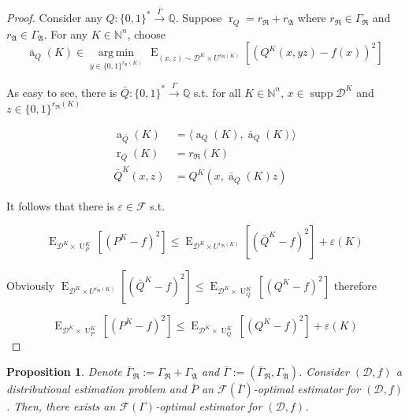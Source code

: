 \documentclass{article}
\numberwithin{equation}{section}
\theoremstyle{definition}
\theoremstyle{plain}
\newtheorem{proposition}{Proposition}[section]
\newcommand{\Bool}{\{0,1\}}
\newcommand{\Words}{{\Bool^*}}
\newcommand{\WordsLen}[1]{{\Bool^{#1}}}
\DeclareMathOperator{\Supp}{supp}
\DeclareMathOperator{\E}{E}
\DeclareMathOperator{\R}{r}
\DeclareMathOperator{\A}{a}
\DeclareMathOperator{\Un}{U}
\newcommand{\Argmin}[1]{\underset{#1}{\operatorname{arg\,min}}\,}
\newcommand{\Nats}{\mathbb{N}}
\newcommand{\Rats}{\mathbb{Q}}
\newcommand{\Chev}[1]{\langle #1 \rangle}
\newcommand{\Dist}{\mathcal{D}}
\newcommand{\GrowR}{\Gamma_{\mathfrak{R}}}
\newcommand{\GrowA}{\Gamma_{\mathfrak{A}}}
\newcommand{\Fall}{\mathcal{F}}
\newcommand{\EG}{\Fall(\Gamma)}
\newcommand{\Scheme}{\xrightarrow{\Gamma}}
\begin{document}
\begin{proof}

Consider any $Q: \Words \xrightarrow{\bar{\Gamma}} \Rats$. Suppose $\R_Q=r_{\mathfrak{R}}+r_{\mathfrak{A}}$ where $r_{\mathfrak{R}} \in \GrowR$ and $r_{\mathfrak{A}} \in \GrowA$. For any $K \in \Nats^n$, choose 
\[\bar{\A}_Q(K) \in \Argmin{y \in \WordsLen{r_{\mathfrak{A}}(K)}} \E_{(x,z) \sim \Dist^{K} \times U^{r_{\mathfrak{R}}(K)}}[(Q^{K}(x,yz) - f(x))^2]\]

As easy to see, there is $\bar{Q}: \Words \Scheme \Rats$ s.t. for all $K \in \Nats^n$, $x \in \Supp \Dist^{K}$ and $z \in \WordsLen{r_{\mathfrak{R}}(K)}$

\begin{align*}
\A_{\bar{Q}}(K)&=\Chev{\A_Q(K),\bar{\A}_Q(K)} \\
\R_{\bar{Q}}(K) &= r_{\mathfrak{R}}(K) \\
\bar{Q}^{K}(x,z)&=Q^{K}(x,\bar{\A}_Q(K)z)
\end{align*}

It follows that there is $\varepsilon \in \Fall$ s.t.

$$\E_{\Dist^{K} \times \Un_P^{K}}[(P^{K} - f)^2] \leq \E_{\Dist^{K} \times U^{r_{\mathfrak{R}}(K)}}[(\bar{Q}^{K} - f)^2] + \varepsilon(K)$$

Obviously $\E_{\Dist^{K} \times U^{r_{\mathfrak{R}}(K)}}[(\bar{Q}^{K} - f)^2] \leq \E_{\Dist^{K} \times \Un_Q^{K}}[(Q^{K} - f)^2]$ therefore

$$\E_{\Dist^{K} \times \Un_P^{K}}[(P^{K} - f)^2] \leq \E_{\Dist^{K} \times \Un_Q^{K}}[(Q^{K} - f)^2] + \varepsilon(K)$$
\end{proof}

\begin{proposition}

Denote $\bar{\Gamma}_{\mathfrak{R}}:=\GrowR+\GrowA$ and $\bar{\Gamma}:=(\bar{\Gamma}_{\mathfrak{R}},\GrowA)$. Consider $(\Dist,f)$ a distributional estimation problem and $\bar{P}$ an $\Fall(\bar{\Gamma})$-optimal estimator for $(\Dist,f)$. Then, there exists an $\EG$-optimal estimator for $(\Dist,f)$.

\end{proposition}
\end{document}
